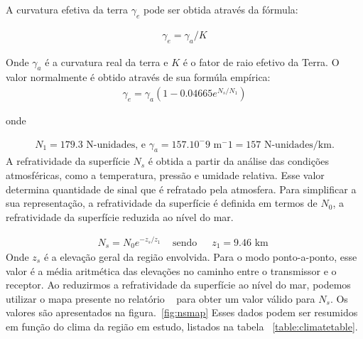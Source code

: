 A curvatura efetiva da terra $\gamma_e$ pode ser obtida através da fórmula:

\begin{align}
\label{ge} \gamma_e = \gamma_a/K
\end{align}


Onde $\gamma_a$ é a curvatura real da terra e $K$ é o fator de raio efetivo da Terra. O valor normalmente é obtido através de sua formúla empírica:
\begin{align}
\label{ge2} \gamma_e = \gamma_a(1-0.04665e^{N_s/N_1})
\end{align}

onde

\begin{align}
\label{n_1} N_1 = 179.3 \text{ N-unidades, e } \gamma_a = 157 . 10^-9 \text{ m} ^-1 = 157 \text{ N-unidades/km.}
\end{align}
A refratividade da superfície \begin{math}N_s\end{math} é obtida a partir da análise das condições atmosféricas, como a temperatura, pressão e umidade relativa. Esse valor determina quantidade de sinal que é refratado pela atmosfera.
Para simplificar a sua representação, a refratividade da superfície  é definida em termos de \begin{math}N_0\end{math}, a refratividade da superfície reduzida ao nível do mar.

\begin{align}
\label{ns} N_s = N_0e^{-z_s/z_1} \,\,\,\,\, \text{ sendo} \,\,\,\,\,\,\,\,\, z_1 = 9.46 \text{ km }
\end{align}
Onde \begin{math}z_s\end{math} é a elevação geral da região envolvida. Para o modo ponto-a-ponto, esse valor é a média aritmética das elevações no caminho entre o transmissor e o receptor.
Ao reduzirmos a refratividade da superfície ao nível do mar, podemos utilizar o mapa presente no relatório ~\cite{longleyricedelta} para obter um valor válido para \begin{math}N_s\end{math}. Os valores são apresentados na figura.~\ref{fig:nsmap} Esses dados podem ser resumidos em função do clima da região em estudo, listados na tabela ~\ref{table:climatetable}.




